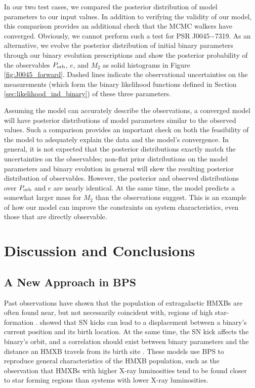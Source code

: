 \documentclass[usenatbib]{mnras}
\begin{document}
In our two test cases, we compared the posterior distribution of model parameters to our input values. In addition to verifying the validity of our model, this comparison provides an additional check that the MCMC walkers have converged. Obviously, we cannot perform such a test for PSR J0045$-$7319. As an alternative, we evolve the posterior distribution of initial binary parameters through our binary evolution prescriptions and show the posterior probability of the observables $P_{\rm orb}$, $e$, and $M_2$ as solid histograms in Figure \ref{fig:J0045_forward}. Dashed lines indicate the observational uncertainties on the measurements (which form the binary likelihood functions defined in Section \ref{sec:likelihood_ind_binary}) of these three parameters. 


Assuming the model can accurately describe the observations, a converged model will have posterior distributions of model parameters similar to the observed values. Such a comparison provides an important check on both the feasibility of the model to adequately explain the data and the model's convergence. In general, it is not expected that the posterior distributions exactly match the uncertainties on the observables; non-flat prior distributions on the model parameters and binary evolution in general will skew the resulting posterior distribution of observables. However, the posterior and observed distributions over $P_{\rm orb}$ and $e$ are nearly identical. At the same time, the model predicts a somewhat larger mass for $M_2$ than the observations suggest. This is an example of how our model can improve the constraints on system characteristics, even those that are directly observable.






\section{Discussion and Conclusions}
\label{sec:discussion}

\subsection{A New Approach in BPS}

Past observations have shown that the population of extragalactic HMXBs are often found near, but not necessarily coincident with, regions of high star-formation \citep{zezas02b,kaaret04}. \citet{sepinsky05} showed that SN kicks can lead to a displacement between a binary's current position and its birth location. At the same time, the SN kick affects the binary's orbit, and a correlation should exist between binary parameters and the distance an HMXB travels from its birth site \citep{zuo10,zuo15}. These models use BPS to reproduce general characteristics of the HMXB population, such as the observation that HMXBs with higher X-ray luminosities tend to be found closer to star forming regions than systems with lower X-ray luminosities.
\end{document}
